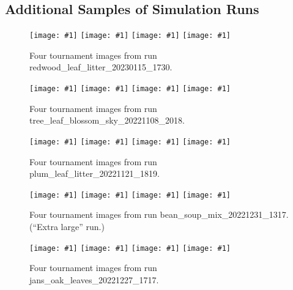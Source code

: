 \documentclass[acmtog,
    anonymous,
    review
    ]{acmart}
\newcommand{\runID}{\footnotesize}
\newcommand{\igfour}[1]{\texttt{[image: \#1]}}
\begin{document}
\subsection{Additional Samples of Simulation Runs}

\begin{figure}[H]
    \igfour{20230116_step_5868.png}
    \hfill
    \igfour{20230116_step_6057.png}
    \hfill
    \igfour{20230116_step_6347.png}
    \hfill
    \igfour{20230116_step_6814.png}
    \caption{Four tournament images from run {\runID redwood\_leaf\_litter\_20230115\_1730}.}
    \label{fig:redwood_leaf_litter_4x}
\end{figure}

\begin{figure}[H]
    \igfour{20221108_2018_step_4655.png}
    \hfill
    \igfour{20221108_2018_step_5498.png}
    \hfill
    \igfour{20221108_2018_step_5947.png}
    \hfill
    \igfour{20221108_2018_step_6562.png}
    \caption{Four tournament images from run {\runID tree\_leaf\_blossom\_sky\_20221108\_2018}.}
    \label{fig:tree_leaf_blossom_sky_4x}
\end{figure}

\begin{figure}[H]
    \igfour{20221121_1819_step_6324.png}
    \hfill
    \igfour{20221121_1819_step_6464.png}
    \hfill
    \igfour{20221121_1819_step_6677.png}
    \hfill
    \igfour{20221121_1819_step_6755.png}
    \caption{Four tournament images from run {\runID plum\_leaf\_litter\_20221121\_1819}.}
    \label{fig:plum_leaf_litter_4x}
\end{figure}

\begin{figure}[H]
    \igfour{20230101_step_10561.png}
    \hfill
    \igfour{20230101_step_10750.png}
    \hfill
    \igfour{20230101_step_10950.png}
    \hfill
    \igfour{20230101_step_11861.png}
    \caption{Four tournament images from run {\runID bean\_soup\_mix\_20221231\_1317}. (“Extra large” run.)}
    \label{fig:bean_soup_mix_4x}
\end{figure}

\begin{figure}[H]
    \igfour{20221228_step_6662.png}
    \hfill
    \igfour{20221228_step_7095.png}
    \hfill
    \igfour{20221228_step_7574.png}
    \hfill
    \igfour{20221228_step_7742.png}
    \caption{Four tournament images from run {\runID jans\_oak\_leaves\_20221227\_1717}.}
    \label{fig:jans_oak_leaves_4x}
\end{figure}
\end{document}
